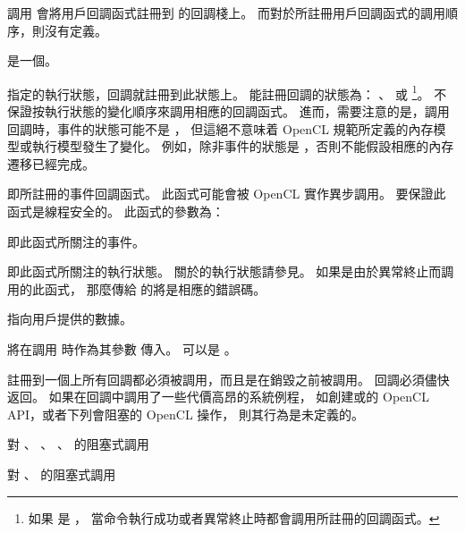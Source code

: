 調用  會將用戶回調函式註冊到  的回調棧上。
而對於所註冊用戶回調函式的調用順序，則沒有定義。

 是一個。

 指定的執行狀態，回調就註冊到此狀態上。
能註冊回調的狀態為：
 、  或 
\footnote{如果  是 ，
當命令執行成功或者異常終止時都會調用所註冊的回調函式。}。
不保證按執行狀態的變化順序來調用相應的回調函式。
進而，需要注意的是，調用回調時，事件的狀態可能不是 ，
但這絕不意味着 OpenCL 規範所定義的內存模型或執行模型發生了變化。
例如，除非事件的狀態是 ，否則不能假設相應的內存遷移已經完成。

 即所註冊的事件回調函式。
此函式可能會被 OpenCL 實作異步調用。
要保證此函式是線程安全的。
此函式的參數為：
\startigBase
\item {} 即此函式所關注的事件。

\item {} 即此函式所關注的執行狀態。
關於的執行狀態請參見。
如果是由於異常終止而調用的此函式，
那麼傳給  的將是相應的錯誤碼。

\item {} 指向用戶提供的數據。
\stopigBase

 將在調用  時作為其參數  傳入。
  可以是 。

註冊到一個上所有回調都必須被調用，而且是在銷毀之前被調用。
回調必須儘快返回。
如果在回調中調用了一些代價高昂的系統例程，
如創建或的 OpenCL API，或者下列會阻塞的 OpenCL 操作，
則其行為是未定義的。
\startigBase
\item {}

\item {}

\item 對 、 、
 、  的阻塞式調用

\item 對 、  的阻塞式調用

